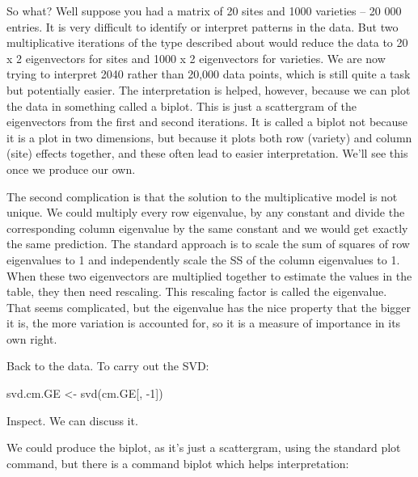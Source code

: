 \documentclass[
]{book}
\newenvironment{Shaded}{\begin{snugshade}}{\end{snugshade}}
\newcommand{\DecValTok}[1]{\textcolor[rgb]{0.00,0.00,0.81}{#1}}
\newcommand{\FunctionTok}[1]{\textcolor[rgb]{0.00,0.00,0.00}{#1}}
\newcommand{\NormalTok}[1]{#1}
\newcommand{\OtherTok}[1]{\textcolor[rgb]{0.56,0.35,0.01}{#1}}
\newcommand{\SpecialCharTok}[1]{\textcolor[rgb]{0.00,0.00,0.00}{#1}}
\begin{document}
So what? Well suppose you had a matrix of 20 sites and 1000 varieties -- 20 000 entries. It is very difficult to identify or interpret patterns in the data. But two multiplicative iterations of the type described about would reduce the data to 20 x 2 eigenvectors for sites and 1000 x 2 eigenvectors for varieties. We are now trying to interpret 2040 rather than 20,000 data points, which is still quite a task but potentially easier. The interpretation is helped, however, because we can plot the data in something called a biplot. This is just a scattergram of the eigenvectors from the first and second iterations. It is called a biplot not because it is a plot in two dimensions, but because it plots both row (variety) and column (site) effects together, and these often lead to easier interpretation. We'll see this once we produce our own.

The second complication is that the solution to the multiplicative model is not unique. We could multiply every row eigenvalue, by any constant and divide the corresponding column eigenvalue by the same constant and we would get exactly the same prediction. The standard approach is to scale the sum of squares of row eigenvalues to 1 and independently scale the SS of the column eigenvalues to 1. When these two eigenvectors are multiplied together to estimate the values in the table, they then need rescaling. This rescaling factor is called the eigenvalue. That seems complicated, but the eigenvalue has the nice property that the bigger it is, the more variation is accounted for, so it is a measure of importance in its own right.

Back to the data. To carry out the SVD:

\begin{Shaded}
\begin{Highlighting}[]
\NormalTok{svd.cm.GE }\OtherTok{\textless{}{-}} \FunctionTok{svd}\NormalTok{(cm.GE[, }\SpecialCharTok{{-}}\DecValTok{1}\NormalTok{])}
\end{Highlighting}
\end{Shaded}

Inspect. We can discuss it.

We could produce the biplot, as it's just a scattergram, using the standard plot command, but there is a command biplot which helps interpretation:

\begin{Shaded}
\end{Shaded}
\end{document}

